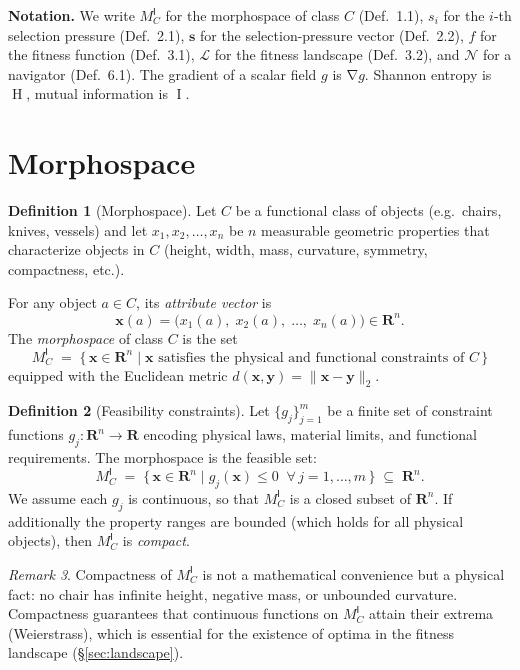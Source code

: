 \documentclass[11pt, a4paper]{article}
\theoremstyle{definition}
\newtheorem{definition}{Definition}[section]
\theoremstyle{plain}
\theoremstyle{remark}
\newtheorem{remark}[definition]{Remark}
\newcommand{\MC}{M^{\mathsf{I}}_C}          %
\providecommand{\Rn}{}
\renewcommand{\Rn}{\mathbf{R}^n}            %
\providecommand{\R}{}
\renewcommand{\R}{\mathbf{R}}               %
\newcommand{\FitLand}{\mathcal{L}}           %
\newcommand{\Nav}{\mathcal{N}}               %
\newcommand{\norm}[1]{\lVert #1 \rVert}
\DeclareMathOperator{\grad}{\nabla}
\DeclareMathOperator{\MI}{I}                 %
\DeclareMathOperator{\Ent}{H}                %
\begin{document}
\medskip\noindent\textbf{Notation.}
We write $\MC$ for the morphospace of class $C$ (Def.~1.1),
$s_i$ for the $i$-th selection pressure (Def.~2.1),
$\bm{s}$ for the selection-pressure vector (Def.~2.2),
$f$ for the fitness function (Def.~3.1),
$\FitLand$ for the fitness landscape (Def.~3.2),
and $\Nav$ for a navigator (Def.~6.1).
The gradient of a scalar field $g$ is $\grad g$.
Shannon entropy is $\Ent$, mutual information is $\MI$.

\newpage
\section{Morphospace}\label{sec:morphospace}

\begin{definition}[Morphospace]\label{def:1.1}
Let $C$ be a functional class of objects (e.g.\ chairs, knives, vessels)
and let $x_1, x_2, \ldots, x_n$ be $n$ measurable geometric properties
that characterize objects in $C$ (height, width, mass, curvature,
symmetry, compactness, etc.).

For any object $a \in C$, its \emph{attribute vector} is
\[
  \bm{x}(a) = \bigl(x_1(a),\; x_2(a),\; \ldots,\; x_n(a)\bigr) \in \Rn.
\]
The \emph{morphospace} of class $C$ is the set
\[
  \MC \;=\; \bigl\{\, \bm{x} \in \Rn
    \;\big|\; \bm{x} \text{ satisfies the physical and functional
    constraints of } C \,\bigr\}
\]
equipped with the Euclidean metric $d(\bm{x}, \bm{y}) = \norm{\bm{x} - \bm{y}}_2$.
\end{definition}

\begin{definition}[Feasibility constraints]\label{def:1.2}
Let $\{g_j\}_{j=1}^{m}$ be a finite set of constraint functions
$g_j : \Rn \to \R$ encoding physical laws, material limits, and
functional requirements. The morphospace is the feasible set:
\[
  \MC \;=\; \bigl\{\, \bm{x} \in \Rn
    \;\big|\; g_j(\bm{x}) \leq 0 \;\;\forall\, j = 1, \ldots, m
  \,\bigr\} \;\subseteq\; \Rn.
\]
We assume each $g_j$ is continuous, so that $\MC$ is a closed subset
of\/ $\Rn$. If additionally the property ranges are bounded (which holds
for all physical objects), then $\MC$ is \emph{compact}.
\end{definition}

\begin{remark}
Compactness of\/ $\MC$ is not a mathematical convenience but a physical
fact: no chair has infinite height, negative mass, or unbounded curvature.
Compactness guarantees that continuous functions on $\MC$ attain their
extrema (Weierstrass), which is essential for the existence of optima in
the fitness landscape (\S\ref{sec:landscape}).
\end{remark}
\end{document}
